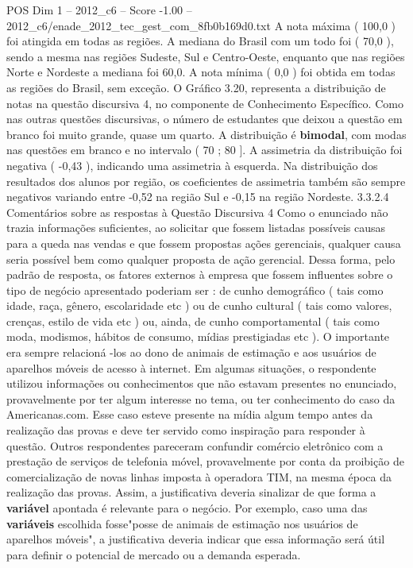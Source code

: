 \begin{textsample}{POS Dim 1 – 2012\_c6 – Score -1.00 – 2012\_c6/enade\_2012\_tec\_gest\_com\_8fb0b169d0.txt}
A nota máxima ( 100,0 ) foi atingida em todas as regiões.
A mediana do Brasil com um todo foi ( 70,0 ), sendo a mesma nas regiões Sudeste, Sul e Centro-Oeste, enquanto que nas regiões Norte e Nordeste a mediana foi 60,0.
A nota mínima ( 0,0 ) foi obtida em todas as regiões do Brasil, sem exceção.
O Gráfico 3.20, representa a distribuição de notas na questão discursiva 4, no componente de Conhecimento Específico.
Como nas outras questões discursivas, o número de estudantes que deixou a questão em branco foi muito grande, quase um quarto.
A distribuição é \textbf{bimodal}, com modas nas questões em branco e no intervalo ( 70 ; 80 ].
A assimetria da distribuição foi negativa ( -0,43 ), indicando uma assimetria à esquerda.
Na distribuição dos resultados dos alunos por região, os coeficientes de assimetria também são sempre negativos variando entre -0,52 na região Sul e -0,15 na região Nordeste. 3.3.2.4 Comentários sobre as respostas à Questão Discursiva 4 Como o enunciado não trazia informações suficientes, ao solicitar que fossem listadas possíveis causas para a queda nas vendas e que fossem propostas ações gerenciais, qualquer causa seria possível bem como qualquer proposta de ação gerencial.
Dessa forma, pelo padrão de resposta, os fatores externos à empresa que fossem influentes sobre o tipo de negócio apresentado poderiam ser : de cunho demográfico ( tais como idade, raça, gênero, escolaridade etc ) ou de cunho cultural ( tais como valores, crenças, estilo de vida etc ) ou, ainda, de cunho comportamental ( tais como moda, modismos, hábitos de consumo, mídias prestigiadas etc ).
O importante era sempre relacioná -los ao dono de animais de estimação e aos usuários de aparelhos móveis de acesso à internet.
Em algumas situações, o respondente utilizou informações ou conhecimentos que não estavam presentes no enunciado, provavelmente por ter algum interesse no tema, ou ter conhecimento do caso da Americanas.com.
Esse caso esteve presente na mídia algum tempo antes da realização das provas e deve ter servido como inspiração para responder à questão.
Outros respondentes pareceram confundir comércio eletrônico com a prestação de serviços de telefonia móvel, provavelmente por conta da proibição de comercialização de novas linhas imposta à operadora TIM, na mesma época da realização das provas.
Assim, a justificativa deveria sinalizar de que forma a \textbf{variável} apontada é relevante para o negócio.
Por exemplo, caso uma das \textbf{variáveis} escolhida fosse"posse de animais de estimação nos usuários de aparelhos móveis", a justificativa deveria indicar que essa informação será útil para definir o potencial de mercado ou a demanda esperada.

\end{textsample}
